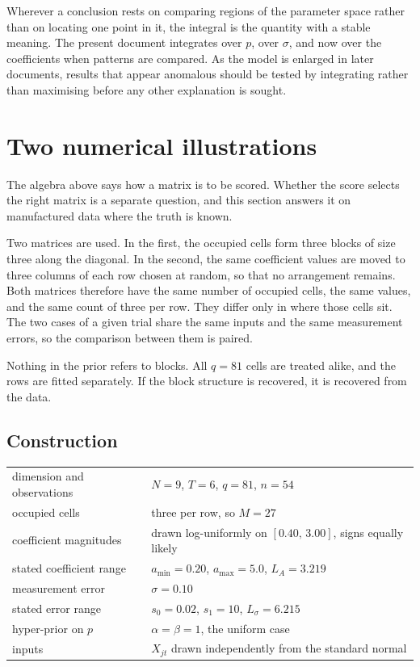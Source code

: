 Wherever a conclusion rests on comparing regions of the parameter space rather than
on locating one point in it, the integral is the quantity with a stable meaning. The
present document integrates over $p$, over $\sigma$, and now over the coefficients
when patterns are compared. As the model is enlarged in later documents, results that
appear anomalous should be tested by integrating rather than maximising before any
other explanation is sought.

\section{Two numerical illustrations}
\label{sec:examples}

The algebra above says how a matrix is to be scored. Whether the score selects the
right matrix is a separate question, and this section answers it on manufactured data
where the truth is known.

Two matrices are used. In the first, the occupied cells form three blocks of size
three along the diagonal. In the second, the same coefficient values are moved to
three columns of each row chosen at random, so that no arrangement remains. Both
matrices therefore have the same number of occupied cells, the same values, and the
same count of three per row. They differ only in where those cells sit. The two cases
of a given trial share the same inputs and the same measurement errors, so the
comparison between them is paired.

Nothing in the prior refers to blocks. All $q = 81$ cells are treated alike, and the
rows are fitted separately. If the block structure is recovered, it is recovered from
the data.

\subsection{Construction}

\begin{center}
\begin{tabular}{ll}
dimension and observations & $N = 9$, \quad $T = 6$, \quad $q = 81$, \quad $n = 54$ \\
occupied cells & three per row, so $M = 27$ \\
coefficient magnitudes & drawn log-uniformly on $[0.40,\, 3.00]$, signs equally
likely \\
stated coefficient range & $a_{\min} = 0.20$, \quad $a_{\max} = 5.0$, \quad
$L_{A} = 3.219$ \\
measurement error & $\sigma = 0.10$ \\
stated error range & $s_{0} = 0.02$, \quad $s_{1} = 10$, \quad
$L_{\sigma} = 6.215$ \\
hyper-prior on $p$ & $\alpha = \beta = 1$, the uniform case \\
inputs & $X_{jt}$ drawn independently from the standard normal \\
\end{tabular}
\end{center}

